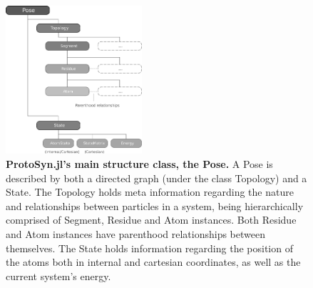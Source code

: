 \documentclass{juliacon}
\begin{document}
\begin{figure}[h]
\centering
\includegraphics[width=0.45\textwidth]{ProtoSynArticle-IM2}
\caption{\textbf{ProtoSyn.jl's main structure class, the Pose.} A Pose is described by both a directed graph (under the class Topology) and a State. The Topology holds meta information regarding the nature and relationships between particles in a system, being hierarchically comprised of Segment, Residue and Atom instances. Both Residue and Atom instances have parenthood relationships between themselves. The State holds information regarding the position of the atoms both in internal and cartesian coordinates, as well as the current system’s energy.}
\label{fig:ProtoSynArticle-IM2}
\end{figure}
\end{document}
